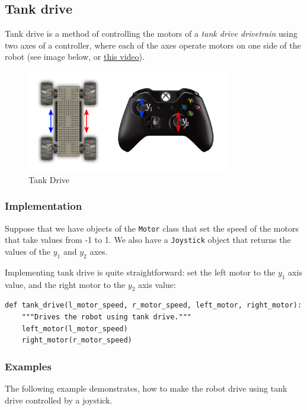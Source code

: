 \documentclass[12pt,twoside]{article}
\begin{document}
\subsection{Tank drive}
Tank drive is a method of controlling the motors of a \textit{tank drive drivetrain} using two axes of a controller, where each of the axes operate motors on one side of the robot (see image below, or \href{https://www.youtube.com/watch?v=vK2CGj8gAWc}{this video}).

\begin{figure}[H]
\centering
\includegraphics[width=0.8\textwidth]{../assets/images/drivetrain-control/tank-drive.png}
\caption{Tank Drive}
\end{figure}


\subsubsection{Implementation}
Suppose that we have objects of the \texttt{Motor} class that set the speed of the motors that take values from -1 to 1. We also have a \texttt{Joystick} object that returns the values of the $y_1$ and $y_2$ axes.

Implementing tank drive is quite straightforward: set the left motor to the $y_1$ axis value, and the right motor to the $y_2$ axis value:

\begin{verbatim}
def tank_drive(l_motor_speed, r_motor_speed, left_motor, right_motor):
    """Drives the robot using tank drive."""
    left_motor(l_motor_speed)
    right_motor(r_motor_speed)
\end{verbatim}



\subsubsection{Examples}
The following example demonstrates, how to make the robot drive using tank drive controlled by a joystick.
\end{document}
